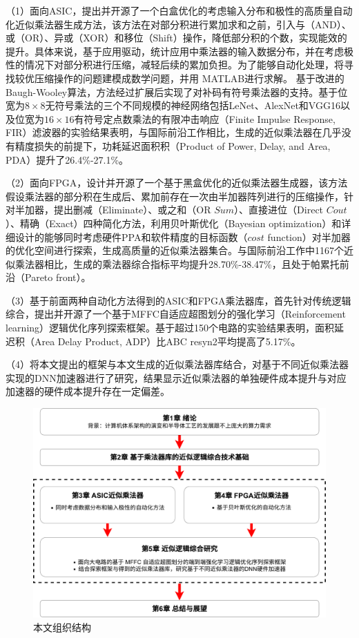 （1）面向ASIC，提出并开源了一个白盒优化的考虑输入分布和极性的高质量自动化近似乘法器生成方法，该方法在对部分积进行累加求和之前，引入与（AND）、或（OR）、异或（XOR）和移位（Shift）操作，降低部分积的个数，实现能效的提升。具体来说，基于应用驱动，统计应用中乘法器的输入数据分布，并在考虑极性的情况下对部分积进行压缩，减轻后续的累加负担。为了能够自动化处理，将寻找较优压缩操作的问题建模成数学问题，并用 MATLAB进行求解。
基于改进的Baugh-Wooley算法\cite{EM:baugh-wooley,EM:baugh-wooley_modified_PP_reorga,EM:baugh-wooley_diff}，方法经过扩展后实现了对补码有符号乘法器的支持。基于位宽为$8\times8$无符号乘法的三个不同规模的神经网络包括LeNet、AlexNet和VGG16以及位宽为$16\times16$有符号定点数乘法的有限冲击响应（Finite Impulse Response, FIR）滤波器的实验结果表明，与国际前沿工作相比，生成的近似乘法器在几乎没有精度损失的前提下，功耗延迟面积积（Product of Power, Delay, and Area, PDA）提升了26.4\%-27.1\%。

（2）面向FPGA，设计并开源了一个基于黑盒优化的近似乘法器生成器，该方法假设乘法器的部分积在生成后、累加前存在一次由半加器阵列进行的压缩操作，针对半加器，提出删减（Eliminate）、或之和（OR $Sum$）、直接进位（Direct $Cout$）、精确（Exact）四种简化方法，利用贝叶斯优化（Bayesian optimization）和详细设计的能够同时考虑硬件PPA和软件精度的目标函数（$cost$ function）对半加器的优化空间进行探索，生成高质量的近似乘法器集合。与国际前沿工作中1167个近似乘法器相比，生成的乘法器综合指标平均提升28.70\%-38.47\%，且处于帕累托前沿（Pareto front）。

（3）基于前面两种自动化方法得到的ASIC和FPGA乘法器库，首先针对传统逻辑综合，提出并开源了一个基于MFFC自适应超图划分的强化学习（Reinforcement learning）逻辑优化序列探索框架。基于超过150个电路的实验结果表明，面积延迟积（Area Delay Product, ADP）比ABC\cite{LS:ABC} resyn2平均提高了5.17\%。

（4）将本文提出的框架与本文生成的近似乘法器库结合，对基于不同近似乘法器实现的DNN加速器进行了研究，结果显示近似乘法器的单独硬件成本提升与对应加速器的硬件成本提升存在一定偏差。

\begin{figure}[!htb]
    \centering
    \includegraphics[width=\textwidth]{figs/论文结构.pdf}
    \caption{本文组织结构}
    \label{本文组织结构}
\end{figure}

